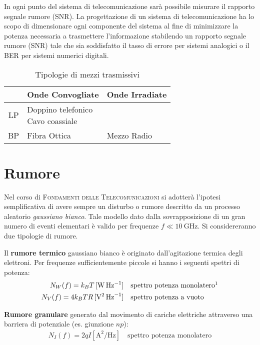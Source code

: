 In ogni punto del sistema di telecomunicazione sarà possibile misurare il rapporto segnale rumore (\ac{SNR}). La progettazione di un sistema di telecomunicazione ha lo scopo di dimensionare ogni componente del sistema al fine di minimizzare la potenza necessaria a trasmettere l'informazione stabilendo un rapporto segnale rumore (\ac{SNR}) tale che sia soddisfatto il tasso di errore per sistemi analogici o il \ac{BER} per sistemi numerici digitali.

\begin{table}[!ht]\centering
	\begin{tabular}{c|p{}|p{}}
		\hline \rule[-2ex]{0pt}{5.5ex}  & Onde Convogliate & Onde Irradiate \\
		\hline \rule[-2ex]{0pt}{5.5ex} \textsc{LP} & \parbox[c]{5cm}{Doppino telefonico\\ Cavo coassiale} &  \\
		\hline \rule[-2ex]{0pt}{5.5ex} \textsc{BP} & Fibra Ottica & Mezzo Radio \\
		\hline
	\end{tabular}
	\caption{Tipologie di mezzi trasmissivi}\label{tab:mezzi-trasmissivi}
\end{table}

\section{Rumore}
Nel corso di \textsc{Fondamenti delle Telecomunicazioni} si adotterà l'ipotesi semplificativa di avere sempre un disturbo o rumore descritto da un processo aleatorio \emph{gaussiano bianco}. Tale modello dato dalla sovrapposizione di un gran numero di eventi elementari è valido per frequenze $f\ll\SI{10}{\giga\hertz}$. Si considereranno due tipologie di rumore.

\begin{definizione}
Il \textbf{rumore termico} gaussiano bianco è originato dall'agitazione termica degli elettroni. Per frequenze sufficientemente piccole si hanno i seguenti spettri di potenza:
\begin{equation}\begin{split}
N_W(f)=k_B T \,[\si{\watt\per\hertz}] &\quad \text{spettro potenza monolatero}\footnotemark\\
N_V(f)=4 k_B T R \,[\si{\volt\squared\per\hertz}] &\quad \text{spettro potenza a vuoto}
\end{split}\end{equation}
\end{definizione}
\begin{definizione}
\textbf{Rumore granulare} generato dal movimento di cariche elettriche attraverso una barriera di potenziale (es. giunzione $np$):
\begin{equation}\begin{split} N_I(f)= 2 q I [\si{\ampere\squared\per\hertz}]\quad\text{spettro potenza monolatero} \end{split}\end{equation}
\end{definizione}

